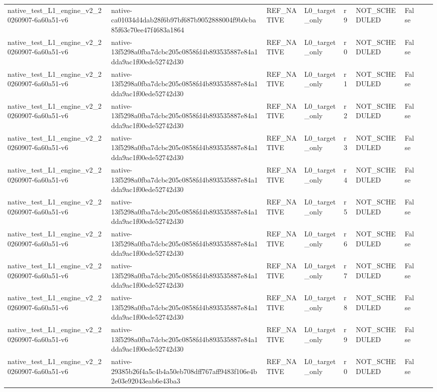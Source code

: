 \begin{tabular}{lllllllll}
native\_test\_L1\_engine\_v2\_20260907-6a60a51-v6 & native-ca01034d4dab28f6b97bf687b9052888004f9b0cba85f63c70ee47f4683a1864 & REF\_NATIVE & L0\_target\_only & r9 & NOT\_SCHEDULED & False &  &  \\
native\_test\_L1\_engine\_v2\_20260907-6a60a51-v6 & native-13f5298a0fba7dcbc205c0858fd4b893535887e84a1dda9ac1f00ede52742d30 & REF\_NATIVE & L0\_target\_only & r0 & NOT\_SCHEDULED & False &  &  \\
native\_test\_L1\_engine\_v2\_20260907-6a60a51-v6 & native-13f5298a0fba7dcbc205c0858fd4b893535887e84a1dda9ac1f00ede52742d30 & REF\_NATIVE & L0\_target\_only & r1 & NOT\_SCHEDULED & False &  &  \\
native\_test\_L1\_engine\_v2\_20260907-6a60a51-v6 & native-13f5298a0fba7dcbc205c0858fd4b893535887e84a1dda9ac1f00ede52742d30 & REF\_NATIVE & L0\_target\_only & r2 & NOT\_SCHEDULED & False &  &  \\
native\_test\_L1\_engine\_v2\_20260907-6a60a51-v6 & native-13f5298a0fba7dcbc205c0858fd4b893535887e84a1dda9ac1f00ede52742d30 & REF\_NATIVE & L0\_target\_only & r3 & NOT\_SCHEDULED & False &  &  \\
native\_test\_L1\_engine\_v2\_20260907-6a60a51-v6 & native-13f5298a0fba7dcbc205c0858fd4b893535887e84a1dda9ac1f00ede52742d30 & REF\_NATIVE & L0\_target\_only & r4 & NOT\_SCHEDULED & False &  &  \\
native\_test\_L1\_engine\_v2\_20260907-6a60a51-v6 & native-13f5298a0fba7dcbc205c0858fd4b893535887e84a1dda9ac1f00ede52742d30 & REF\_NATIVE & L0\_target\_only & r5 & NOT\_SCHEDULED & False &  &  \\
native\_test\_L1\_engine\_v2\_20260907-6a60a51-v6 & native-13f5298a0fba7dcbc205c0858fd4b893535887e84a1dda9ac1f00ede52742d30 & REF\_NATIVE & L0\_target\_only & r6 & NOT\_SCHEDULED & False &  &  \\
native\_test\_L1\_engine\_v2\_20260907-6a60a51-v6 & native-13f5298a0fba7dcbc205c0858fd4b893535887e84a1dda9ac1f00ede52742d30 & REF\_NATIVE & L0\_target\_only & r7 & NOT\_SCHEDULED & False &  &  \\
native\_test\_L1\_engine\_v2\_20260907-6a60a51-v6 & native-13f5298a0fba7dcbc205c0858fd4b893535887e84a1dda9ac1f00ede52742d30 & REF\_NATIVE & L0\_target\_only & r8 & NOT\_SCHEDULED & False &  &  \\
native\_test\_L1\_engine\_v2\_20260907-6a60a51-v6 & native-13f5298a0fba7dcbc205c0858fd4b893535887e84a1dda9ac1f00ede52742d30 & REF\_NATIVE & L0\_target\_only & r9 & NOT\_SCHEDULED & False &  &  \\
native\_test\_L1\_engine\_v2\_20260907-6a60a51-v6 & native-29385b26f4a5c4b4a50eb708dff767aff9483f106e4b2e03e92043eab6e43ba3 & REF\_NATIVE & L0\_target\_only & r0 & NOT\_SCHEDULED & False &  &  \\

\end{tabular}
